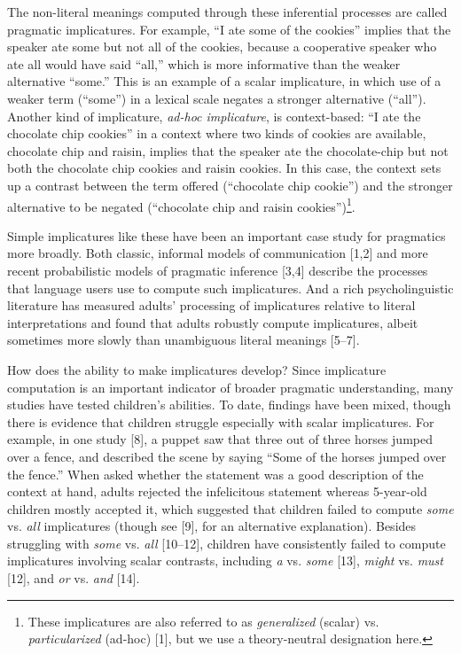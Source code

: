 \documentclass{rsos}
\begin{document}
The non-literal meanings computed through these inferential processes
are called pragmatic implicatures. For example, ``I ate some of the
cookies'' implies that the speaker ate some but not all of the cookies,
because a cooperative speaker who ate all would have said ``all,'' which
is more informative than the weaker alternative ``some.'' This is an
example of a scalar implicature, in which use of a weaker term
(``some'') in a lexical scale negates a stronger alternative (``all'').
Another kind of implicature, \emph{ad-hoc implicature}, is
context-based: ``I ate the chocolate chip cookies'' in a context where
two kinds of cookies are available, chocolate chip and raisin, implies
that the speaker ate the chocolate-chip but not both the chocolate chip
cookies and raisin cookies. In this case, the context sets up a contrast
between the term offered (``chocolate chip cookie'') and the stronger
alternative to be negated (``chocolate chip and raisin
cookies'')\footnote{These implicatures are also referred to as \emph{generalized}
  (scalar) vs. \emph{particularized} (ad-hoc) {[}1{]}, but we use a
  theory-neutral designation here.}.

Simple implicatures like these have been an important case study for
pragmatics more broadly. Both classic, informal models of communication
{[}1,2{]} and more recent probabilistic models of pragmatic inference
{[}3,4{]} describe the processes that language users use to compute such
implicatures. And a rich psycholinguistic literature has measured
adults' processing of implicatures relative to literal interpretations
and found that adults robustly compute implicatures, albeit sometimes
more slowly than unambiguous literal meanings {[}5--7{]}.

How does the ability to make implicatures develop? Since implicature
computation is an important indicator of broader pragmatic
understanding, many studies have tested children's abilities. To date,
findings have been mixed, though there is evidence that children struggle 
especially with scalar implicatures. For example, in one
study {[}8{]}, a puppet saw that three out of three horses jumped over a fence,
and described the scene by saying ``Some of the horses jumped over the
fence.'' When asked whether the statement was a good description of the
context at hand, adults rejected the infelicitous statement whereas
5-year-old children mostly accepted it, which suggested that children
failed to compute \emph{some} vs. \emph{all} implicatures (though see
{[}9{]}, for an alternative explanation). Besides struggling with
\emph{some} vs. \emph{all} {[}10--12{]}, children have consistently
failed to compute implicatures involving scalar contrasts, including
\emph{a} vs. \emph{some} {[}13{]}, \emph{might} vs. \emph{must}
{[}12{]}, and \emph{or} vs. \emph{and} {[}14{]}.
\end{document}
